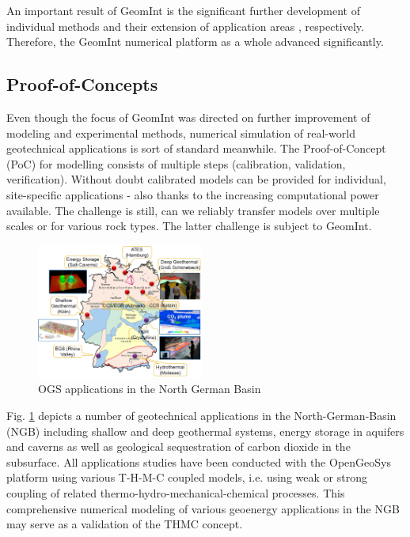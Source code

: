 An important result of GeomInt is the significant further development of individual methods and their extension of application areas \cite{Sattarietal2019b,schmidt2019,Yoshioka2020}, respectively. Therefore, the GeomInt numerical platform as a whole advanced significantly.

\clearpage

\subsection{Proof-of-Concepts}
\label{sec:poc}

Even though the focus of GeomInt was directed on further improvement of modeling and experimental methods, numerical simulation of real-world geotechnical applications is sort of standard meanwhile.
The Proof-of-Concept (PoC) for modelling consists of multiple steps (calibration, validation, verification). Without doubt calibrated models can be provided for individual, site-specific applications - also thanks to the increasing computational power available. The challenge is still, can we reliably transfer models over multiple scales or for various rock types. The latter challenge is subject to GeomInt.

\begin{figure}
\vspace{-4mm}
\centering
\includegraphics[width=0.49\textwidth]{figures/geoenergy-map}
\caption{OGS applications in the North German Basin}
\label{fig:ogs-ngb}
\end{figure}
Fig. \ref{fig:ogs-ngb} depicts a number of geotechnical applications in the North-German-Basin (NGB) including shallow and deep geothermal systems, energy storage in aquifers and caverns as well as geological sequestration of carbon dioxide in the subsurface.
All applications studies have been conducted with the OpenGeoSys platform using various T-H-M-C coupled models, i.e. using weak or strong coupling of related thermo-hydro-mechanical-chemical processes. This comprehensive numerical modeling of various geoenergy applications in the NGB may serve as a validation of the THMC concept.


